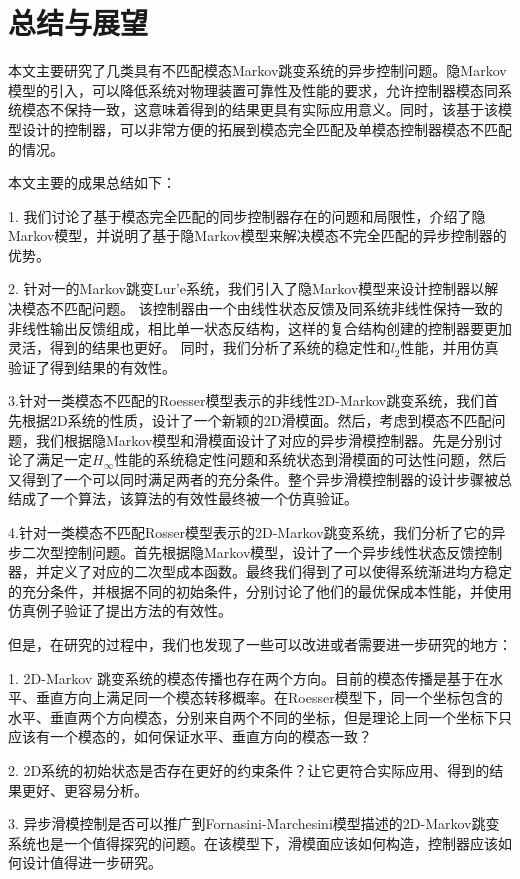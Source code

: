 
\chapter{总结与展望}
	本文主要研究了几类具有不匹配模态Markov跳变系统的异步控制问题。隐Markov模型的引入，可以降低系统对物理装置可靠性及性能的要求，允许控制器模态同系统模态不保持一致，这意味着得到的结果更具有实际应用意义。同时，该基于该模型设计的控制器，可以非常方便的拓展到模态完全匹配及单模态控制器模态不匹配的情况。
	
	本文主要的成果总结如下：
	
	1. 我们讨论了基于模态完全匹配的同步控制器存在的问题和局限性，介绍了隐Markov模型，并说明了基于隐Markov模型来解决模态不完全匹配的异步控制器的优势。
	
	2. 针对一的Markov跳变Lur'e系统，我们引入了隐Markov模型来设计控制器以解决模态不匹配问题。 该控制器由一个由线性状态反馈及同系统非线性保持一致的非线性输出反馈组成，相比单一状态反结构，这样的复合结构创建的控制器要更加灵活，得到的结果也更好。 同时，我们分析了系统的稳定性和$l_2$性能，并用仿真验证了得到结果的有效性。
	
	3.针对一类模态不匹配的Roesser模型表示的非线性2D-Markov跳变系统，我们首先根据2D系统的性质，设计了一个新颖的2D滑模面。然后，考虑到模态不匹配问题，我们根据隐Markov模型和滑模面设计了对应的异步滑模控制器。先是分别讨论了满足一定$H_\infty$性能的系统稳定性问题和系统状态到滑模面的可达性问题，然后又得到了一个可以同时满足两者的充分条件。整个异步滑模控制器的设计步骤被总结成了一个算法，该算法的有效性最终被一个仿真验证。
	
	4.针对一类模态不匹配Rosser模型表示的2D-Markov跳变系统，我们分析了它的异步二次型控制问题。首先根据隐Markov模型，设计了一个异步线性状态反馈控制器，并定义了对应的二次型成本函数。最终我们得到了可以使得系统渐进均方稳定的充分条件，并根据不同的初始条件，分别讨论了他们的最优保成本性能，并使用仿真例子验证了提出方法的有效性。
	
	但是，在研究的过程中，我们也发现了一些可以改进或者需要进一步研究的地方：
	
	1. 2D-Markov 跳变系统的模态传播也存在两个方向。目前的模态传播是基于在水平、垂直方向上满足同一个模态转移概率。在Roesser模型下，同一个坐标包含的水平、垂直两个方向模态，分别来自两个不同的坐标，但是理论上同一个坐标下只应该有一个模态的，如何保证水平、垂直方向的模态一致？
	
	2. 2D系统的初始状态是否存在更好的约束条件？让它更符合实际应用、得到的结果更好、更容易分析。
	
	3. 异步滑模控制是否可以推广到Fornasini-Marchesini模型描述的2D-Markov跳变系统也是一个值得探究的问题。在该模型下，滑模面应该如何构造，控制器应该如何设计值得进一步研究。